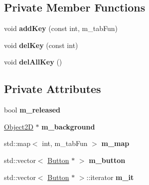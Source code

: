 \subsection*{Private Member Functions}
\begin{DoxyCompactItemize}
\item 
\hypertarget{class_score_state_a83f0b59ad937c9b02e69a3facffcd338}{}void {\bfseries add\+Key} (const int, m\+\_\+tab\+Fun)\label{class_score_state_a83f0b59ad937c9b02e69a3facffcd338}

\item 
\hypertarget{class_score_state_a9522f586a47071e7196c3da6d0c91150}{}void {\bfseries del\+Key} (const int)\label{class_score_state_a9522f586a47071e7196c3da6d0c91150}

\item 
\hypertarget{class_score_state_a74804c61703e0ef47dea0fd73d8cab0a}{}void {\bfseries del\+All\+Key} ()\label{class_score_state_a74804c61703e0ef47dea0fd73d8cab0a}

\end{DoxyCompactItemize}
\subsection*{Private Attributes}
\begin{DoxyCompactItemize}
\item 
\hypertarget{class_score_state_a20e3a1c9fada9fde3436450c6cbf6745}{}bool {\bfseries m\+\_\+released}\label{class_score_state_a20e3a1c9fada9fde3436450c6cbf6745}

\item 
\hypertarget{class_score_state_a62a4cfd1ca3b222718a37ca5eaa61b24}{}\hyperlink{class_object2_d}{Object2\+D} $\ast$ {\bfseries m\+\_\+background}\label{class_score_state_a62a4cfd1ca3b222718a37ca5eaa61b24}

\item 
\hypertarget{class_score_state_a04ec69594a02f7ea2ee77271a7b7caf0}{}std\+::map$<$ int, m\+\_\+tab\+Fun $>$ {\bfseries m\+\_\+map}\label{class_score_state_a04ec69594a02f7ea2ee77271a7b7caf0}

\item 
\hypertarget{class_score_state_a1299910b1fabeb8a5d0ff848f1062510}{}std\+::vector$<$ \hyperlink{class_button}{Button} $\ast$ $>$ {\bfseries m\+\_\+button}\label{class_score_state_a1299910b1fabeb8a5d0ff848f1062510}

\item 
\hypertarget{class_score_state_ab3e5bfc9e7e0914549d495be5b279081}{}std\+::vector$<$ \hyperlink{class_button}{Button} $\ast$ $>$\+::iterator {\bfseries m\+\_\+it}\label{class_score_state_ab3e5bfc9e7e0914549d495be5b279081}

\end{DoxyCompactItemize}
